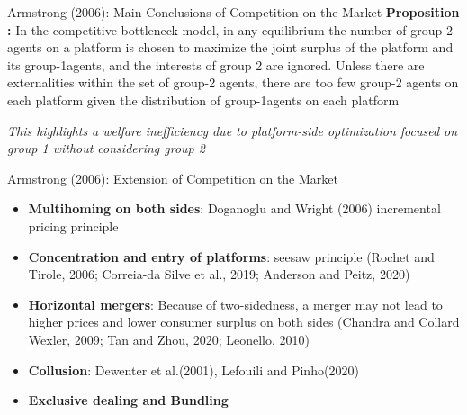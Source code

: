 \documentclass[aspectratio=169]{beamer}  %
\begin{document}
\begin{frame}{Armstrong (2006): Main Conclusions of Competition on the Market}
    \justifying  %
    \textbf{Proposition :}
    In the competitive bottleneck model, in any equilibrium the number of group-2 agents on a platform is chosen to maximize the joint surplus of the platform and its group-1agents, and the interests of group 2 are ignored. Unless there are externalities within the set of group-2 agents, there are too few group-2 agents on each platform given the distribution of group-1agents on each platform
    
    \vspace{1em}
    \textit{This highlights a welfare inefficiency due to platform-side optimization focused on group 1 without considering group 2}
    
    
\end{frame}

\begin{frame}{Armstrong (2006): Extension of Competition on the Market}
    \justifying  %
    
    \begin{itemize}
        \item \textbf{Multihoming on both sides}: Doganoglu and Wright (2006) incremental pricing principle
        \vspace{1em}
        \item \textbf{Concentration and entry of platforms}: seesaw principle (Rochet and Tirole, 2006; Correia-da Silve et al., 2019; Anderson and Peitz, 2020)
        \vspace{1em}
        \item \textbf{Horizontal mergers}: Because of two-sidedness, a merger may not lead to higher prices and lower consumer surplus on both sides (Chandra and Collard Wexler, 2009; Tan and Zhou, 2020; Leonello, 2010)
        \vspace{1em}
        \item \textbf{Collusion}: Dewenter et al.(2001), Lefouili and Pinho(2020)
        \vspace{1em}
        \item \textbf{Exclusive dealing and Bundling}
    \end{itemize}
    
\end{frame}

\end{document}
